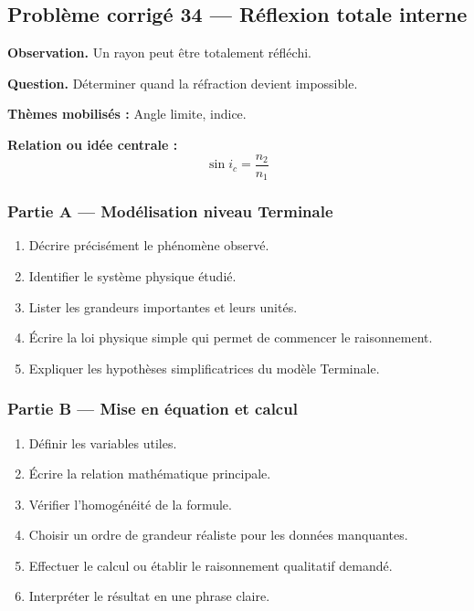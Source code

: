 \documentclass[11pt,a4paper]{article}
\begin{document}
\subsection{Problème corrigé 34 — Réflexion totale interne}

\begin{exercicebox}
\textbf{Observation.} Un rayon peut être totalement réfléchi.

\medskip
\textbf{Question.} Déterminer quand la réfraction devient impossible.

\medskip
\textbf{Thèmes mobilisés :} Angle limite, indice.

\medskip
\textbf{Relation ou idée centrale :}
\[
\sin i_c=\frac{n_2}{n_1}
\]
\end{exercicebox}

\subsubsection*{Partie A — Modélisation niveau Terminale}

\begin{enumerate}
  \item Décrire précisément le phénomène observé.
  \item Identifier le système physique étudié.
  \item Lister les grandeurs importantes et leurs unités.
  \item Écrire la loi physique simple qui permet de commencer le raisonnement.
  \item Expliquer les hypothèses simplificatrices du modèle Terminale.
\end{enumerate}

\subsubsection*{Partie B — Mise en équation et calcul}

\begin{enumerate}
  \item Définir les variables utiles.
  \item Écrire la relation mathématique principale.
  \item Vérifier l'homogénéité de la formule.
  \item Choisir un ordre de grandeur réaliste pour les données manquantes.
  \item Effectuer le calcul ou établir le raisonnement qualitatif demandé.
  \item Interpréter le résultat en une phrase claire.
\end{enumerate}
\end{document}
